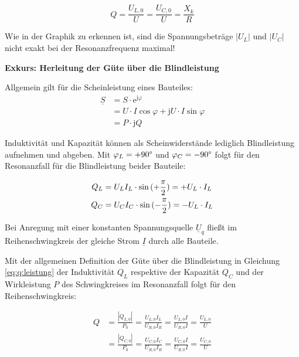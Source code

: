 \begin{frame}
{    \begin{equation}
        Q = \frac{U_{L,0}}{U} = \frac{U_{C,0}}{U} = \frac{X_k}{R}
    \end{equation}

    Wie in der Graphik zu erkennen ist, sind die Spannungsbeträge $|U_L|$ und $|U_C|$ nicht exakt bei der Resonanzfrequenz maximal!

    \textbf{Exkurs: Herleitung der Güte über die Blindleistung}

    Allgemein gilt für die Scheinleistung eines Bauteiles:
    \begin{align}\label{eq:ql}\underline{S}
        &= S \cdot \mathrm{e}^{\mathrm{j}\varphi} \\
        &= U \cdot I \cos{\varphi} + \mathrm{j} U \cdot I \sin{\varphi} \\
        &= P \cdot \mathrm{j} Q
    \end{align}

    Induktivität und Kapazität können als Scheinwiderstände lediglich Blindleistung aufnehmen und abgeben. 
    Mit $\varphi_L = +90\degree$ und $\varphi_C = -90\degree$ folgt für den Resonanzfall für die Blindleistung beider Bauteile:

    \begin{equation}\label{eq:blindleistung:rlcs}
        \begin{aligned}
            Q_L &= U_L I_L \cdot \sin{(+\frac{\pi}{2})} = + U_L \cdot I_L \vphantom{\big|}\\
            Q_C &= U_C I_C \cdot \sin{(-\frac{\pi}{2})} = - U_L \cdot I_L \vphantom{\big|}
        \end{aligned}
    \end{equation}

    Bei Anregung mit einer konstanten Spannungsquelle $\underline{U}_q$ fließt im Reihenschwingkreis
    der gleiche Strom $\underline{I}$ durch alle Bauteile. 

    Mit der allgemeinen Definition der Güte über die Blindleistung in Gleichung \ref{eq:q:leistung}
    der Induktivität $Q_L$ respektive der Kapazität $Q_C$ und der Wirkleistung $P$ des Schwingkreises 
    im Resonanzfall folgt für den Reihenschwingkreis:

    \begin{equation}\label{eq:rlcs:q:guete}
        \begin{aligned}
            Q &= \frac{|Q_{L,0}|}{P_0} = \frac{U_{L,0}I_L}{U_{R,0}I_R} = \frac{U_{L,0}I}{U_{R,0}I} = \frac{U_{L,0}}{U}\\
            &= \frac{|Q_{C,0}|}{P_0} = \frac{U_{C,0}I_C}{U_{R,0}I_R} = \frac{U_{C,0}I}{U_{R,0}I} = \frac{U_{C,0}}{U}
        \end{aligned}
    \end{equation}

}
\end{frame}
